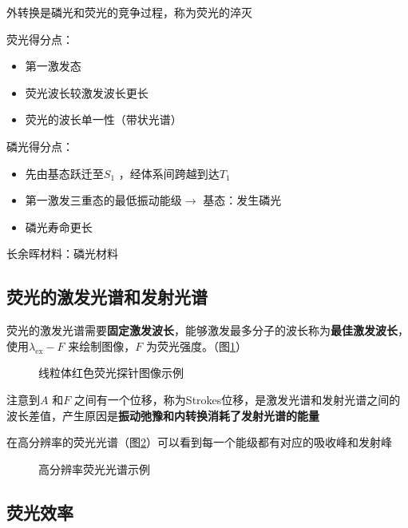 \begin{notation}
    外转换是磷光和荧光的竞争过程，称为荧光的淬灭
\end{notation}
荧光得分点：
\begin{itemize}
    \item 第一激发态
    \item 荧光波长较激发波长更长
    \item 荧光的波长单一性（带状光谱）
\end{itemize}
磷光得分点：
\begin{itemize}
    \item 先由基态跃迁至$S_1$ ，经体系间跨越到达$T_1$
    \item 第一激发三重态的最低振动能级$\to $ 基态：发生磷光
    \item 磷光寿命更长
\end{itemize}
\begin{notation}
    长余晖材料：磷光材料
\end{notation}
\subsection{荧光的激发光谱和发射光谱}%
\label{sub:荧光的激发光谱和发射光谱}
荧光的激发光谱需要\textbf{固定激发波长}，能够激发最多分子的波长称为\textbf{最佳激发波长}，使用$\lambda_\text{ex}-F$ 来绘制图像，$F$ 为荧光强度。（图\ref{fig:线粒体红色荧光探针图像示例}）
\begin{figure}[ht!]
    \centering
    \caption{线粒体红色荧光探针图像示例}
    \label{fig:线粒体红色荧光探针图像示例}
\end{figure}
注意到$A$ 和$F$ 之间有一个位移，称为Strokes位移，是激发光谱和发射光谱之间的波长差值，产生原因是\textbf{振动弛豫和内转换消耗了发射光谱的能量}

在高分辨率的荧光光谱（图\ref{fig:高分辨率荧光光谱示例}）可以看到每一个能级都有对应的吸收峰和发射峰
\begin{figure}[ht!]
    \centering
    \caption{高分辨率荧光光谱示例}
    \label{fig:高分辨率荧光光谱示例}
\end{figure}
\subsection{荧光效率}%
\label{sub:荧光效率}

